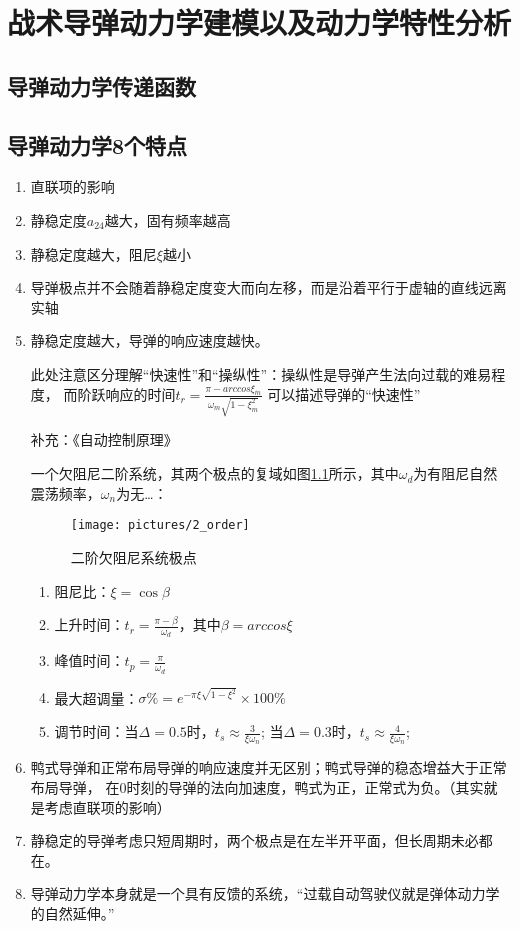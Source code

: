 \chapter{战术导弹动力学建模以及动力学特性分析}
\section{导弹动力学传递函数}
\section{导弹动力学8个特点}
\begin{enumerate}[1)]
    \item 直联项的影响
    \item 静稳定度$a_{24}$越大，固有频率越高
    \item 静稳定度越大，阻尼$\xi$越小
    \item 导弹极点并不会随着静稳定度变大而向左移，而是沿着平行于虚轴的直线远离实轴
    \item 静稳定度越大，导弹的响应速度越快。
    
    {\kaishu 此处注意区分理解“快速性”和“操纵性”：操纵性是导弹产生法向过载的难易程度，
    而阶跃响应的时间$t_r = \frac{\pi - arccos\xi_{\dot{m}}}{\omega_{m}\sqrt{1-\xi_{m}^2}}$
    可以描述导弹的“快速性”
    
    补充：《自动控制原理》
    
    一个欠阻尼二阶系统，其两个极点的复域如图\ref{exrem_point}所示，其中$\omega_d$为有阻尼自然震荡频率，$\omega_n$为无\dots：
    \begin{figure}[H]
        \centering
        \texttt{[image: pictures/2\_order]}
        \caption{二阶欠阻尼系统极点}
        \label{exrem_point}
    \end{figure}
    \begin{enumerate}[i]
        \item 阻尼比：$\xi = \cos\beta$ 
        \item 上升时间：$t_r = \frac{\pi-\beta}{\omega_d}$，其中$\beta = arccos\xi$
        \item 峰值时间：$t_p = \frac{\pi}{\omega_d}$
        \item 最大超调量：$\sigma\% = e^{-\pi\xi\sqrt{1-\xi^2}}\times100\%$
        \item 调节时间：当$\Delta = 0.5$时，$t_s\approx \frac{3}{\xi\omega_n}$;
                        当$\Delta = 0.3$时，$t_s\approx \frac{4}{\xi\omega_n}$;
    \end{enumerate}
    }
    \item 鸭式导弹和正常布局导弹的响应速度并无区别；鸭式导弹的稳态增益大于正常布局导弹，
    在0时刻的导弹的法向加速度，鸭式为正，正常式为负。（其实就是考虑直联项的影响）
    \item 静稳定的导弹考虑只短周期时，两个极点是在左半开平面，但长周期未必都在。
    \item 导弹动力学本身就是一个具有反馈的系统，“过载自动驾驶仪就是弹体动力学的自然延伸。”
\end{enumerate}
